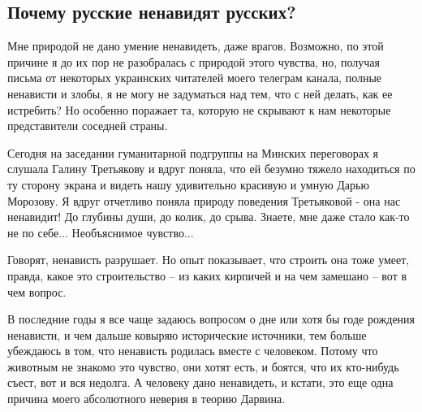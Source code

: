  
 
 
 
 
\subsection{Почему русские ненавидят русских?}
\label{sec:21_12_2021.yz.maj_dnr.1.russkie_nenavist_russkih}


Мне природой не дано умение ненавидеть, даже врагов. Возможно, по этой причине
я до их пор не разобралась с природой этого чувства, но, получая письма от
некоторых украинских читателей моего телеграм канала, полные ненависти и злобы,
я не могу не задуматься над тем, что с ней делать, как ее истребить? Но
особенно поражает та, которую не скрывают к нам некоторые представители
соседней страны.


Сегодня на заседании гуманитарной подгруппы на Минских переговорах я слушала
Галину Третьякову и вдруг поняла, что ей безумно тяжело находиться по ту
сторону экрана и видеть нашу удивительно красивую и умную Дарью Морозову. Я
вдруг отчетливо поняла природу поведения Третьяковой - она нас ненавидит! До
глубины души, до колик, до срыва. Знаете, мне даже стало как-то не по себе...
Необъяснимое чувство...

Говорят, ненависть разрушает. Но опыт показывает, что строить она тоже умеет,
правда, какое это строительство – из каких кирпичей и на чем замешано – вот в
чем вопрос.


В последние годы я все чаще задаюсь вопросом о дне или хотя бы годе рождения
ненависти, и чем дальше ковыряю исторические источники, тем больше убеждаюсь в
том, что ненависть родилась вместе с человеком. Потому что животным не знакомо
это чувство, они хотят есть, и боятся, что их кто-нибудь съест, вот и вся
недолга. А человеку дано ненавидеть, и кстати, это еще одна причина моего
абсолютного неверия в теорию Дарвина.

